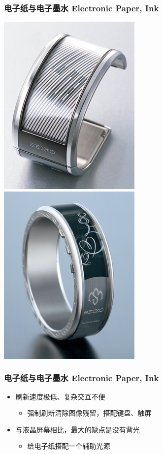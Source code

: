 \documentclass{beamer}
\begin{document}
\begin{frame}
	\frametitle{电子纸与电子墨水 Electronic Paper, Ink}
	\transwipe
	\begin{center}
	\includegraphics[height=.8\textheight, width=.4\textwidth]{images/e-ink-watch1.jpg}
	\includegraphics[height=.8\textheight, width=.4\textwidth]{images/e-ink-watch2.jpg}
	\end{center}
\end{frame}

\begin{frame}
	\frametitle{电子纸与电子墨水 Electronic Paper, Ink}
	\beamertemplatetransparentcovereddynamicmedium
	\begin{itemize}
		\item 刷新速度极低、复杂交互不便\pause
		\begin{itemize}
			\item 强制刷新清除图像残留，搭配键盘、触屏
		\end{itemize}\pause
		\item 与液晶屏幕相比，最大的缺点是没有背光\pause
		\begin{itemize}
			\item 给电子纸搭配一个辅助光源
		\end{itemize}
	\end{itemize}
\end{frame}
\end{document}
